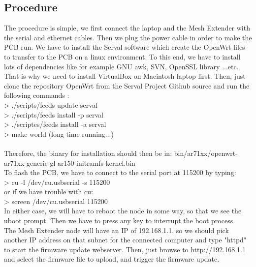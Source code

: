 \subsection{Procedure}
The procedure is simple, we first connect the laptop and the Mesh Extender with the serial and ethernet cables. Then we plug the power cable in order to make the PCB run. We have to install the Serval software which create the OpenWrt files to transfer to the PCB on a linux environment. To this end, we have to install lots of dependencies like for example GNU awk, SVN, OpenSSL library ...etc. That is why we need to install VirtualBox on Macintosh laptop first. Then, just clone the repository OpenWrt from the Serval Project Github source and run the following commands :\\
> ./scripts/feeds update serval\\
> ./scripts/feeds install -p serval\\
> ./scriptes/feeds install -a serval\\
> make world (long time running...)\\ \\
Therefore, the binary for installation should then be in: bin/ar71xx/openwrt-ar71xx-generic-gl-ar150-initramfs-kernel.bin \\
To flash the PCB, we have to connect to the serial port at 115200 by typing:\\

> cu -l /dev/cu.usbserial -s 115200\\

or if we have trouble with cu: \\ 

> screen /dev/cu.usbserial 115200 \\

In either case, we will have to reboot the node in some way, so that we see the uboot prompt. Then we have to press any key to interrupt the boot process.\\
The Mesh Extender node will have an IP of 192.168.1.1, so we should pick another IP address on that subnet for the connected computer and type "httpd" to start the firmware update webserver. Then, just browse to http://192.168.1.1 and select the firmware file to upload, and trigger the firmware update. \\

